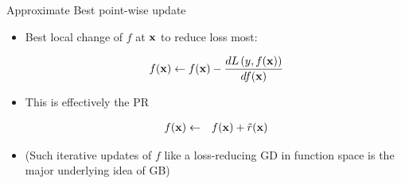\documentclass[11pt,compress,t,notes=noshow, xcolor=table]{beamer}
\begin{document}
\begin{vbframe}{Approximate Best point-wise update}

\begin{itemize}

\item Best local change of $f$ at $\mathbf{x}$ to reduce loss most:

$$
	f(\mathbf{x}) \leftarrow f(\mathbf{x}) - \frac{d L\left(y, f(\mathbf{x})\right)}{d f(\mathbf{x})} 
$$

\item This is effectively the PR 

\begin{eqnarray*}
	f(\mathbf{x}) &\leftarrow& f(\mathbf{x}) + \tilde{r}(\mathbf{x})\\ 
\end{eqnarray*}

\item (Such iterative updates of $f$ like a loss-reducing GD in function space is the major underlying idea of GB)

\end{itemize}

\end{vbframe}
\end{document}
